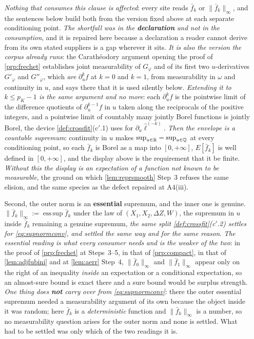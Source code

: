 \emph{Nothing that consumes this clause is affected}: every site reads $\bar f_k$ or
$\|\bar f_k\|_\infty$, and the sentences below build both from the version fixed above at each separate
conditioning point. \emph{The shortfall was in the \textbf{declaration} and not in the consumption}, and it is
repaired here because a declaration a reader cannot derive from its own stated suppliers is a gap
wherever it sits. \emph{It is also
the version the corpus already runs}: the Carath\'eodory argument opening the proof of \cref{prp:frechet}
establishes joint measurability of $G_\varphi$ and of its first two $u$-derivatives $G'_\varphi$ and
$G''_\varphi$, which \emph{are} $\partial_u^{k}f$ at $k=0$ and $k=1$, from measurability in $\omega$ and
continuity in $u$, and says there that it is used silently below. \emph{Extending it to $k\le p_K-1$ is the same argument and no more}: each $\partial_u^{k}f$ is the
pointwise limit of the difference quotients of $\partial_u^{k-1}f$ in $u$ taken along the reciprocals of the
positive integers, and a pointwise limit of countably many jointly Borel functions is jointly Borel, the
device \cref{def:crossfit}\textup{(c$'$.1)} uses for $\partial_u\hat\ell^{(-k)}$. \emph{Then the envelope is a
countable supremum}: continuity in $u$ makes $\sup_{u\in\mathbb{R}}=\sup_{u\in\mathbb{Q}}$ at every conditioning point, so
each $\bar f_k$ is Borel as a map into $[0,+\infty]$, $E[\bar f_k]$ is well defined in $[0,+\infty]$, and the
display above is the requirement that it be finite. \emph{Without this the display is an expectation of a
function not known to be measurable}, the ground on which \cref{lem:reprsmooth} Step~3 refuses the same
elision, and the same species as the defect repaired at A4(iii).

Second, the outer norm is an \textbf{essential} supremum, and the inner one is genuine.
$\|\bar f_k\|_\infty:=\operatorname{ess\,sup}\bar f_k$ under the law of $(X_1,X_2,\Delta Z,W)$, the supremum
in $u$ inside $\bar f_k$ remaining a genuine supremum, \emph{the same split
\cref{def:crossfit}\textup{(c$'$.2)} settles for \eqref{eq:supnormconv}, and settled the same way and for the
same reason}. \emph{The essential reading is what every consumer needs and is the weaker of the two}: in the
proof of \cref{prp:frechet} at Steps~3--5, in that of \cref{prp:compact}, in that of \cref{lem:adjfubini} and
at \cref{lem:aerr} Step~4,
$\|\bar f_0\|_\infty$ and $\|\bar f_1\|_\infty$ appear only on the right of an inequality \emph{inside} an
expectation or a conditional expectation, so an almost-sure bound is exact there and a sure bound would be
surplus strength. \emph{One thing does \textbf{not} carry over from \eqref{eq:supnormconv}}: there the outer
essential supremum needed a measurability argument of its own because the object inside it was random; here
$\bar f_k$ is a \emph{deterministic} function and $\|\bar f_k\|_\infty$ is a number, so no measurability
question arises for the outer norm and none is settled. What had to be settled was only which of the two
readings it is.

